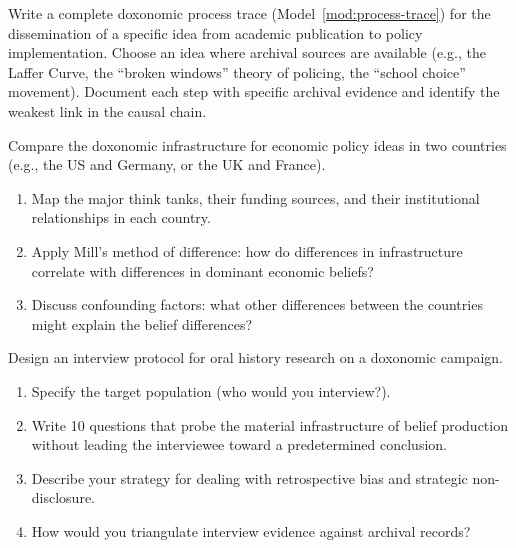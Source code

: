 \begin{exercise}
Write a complete doxonomic process trace (Model~\ref{mod:process-trace}) for the dissemination of a specific idea from academic publication to policy implementation.
Choose an idea where archival sources are available (e.g., the Laffer Curve, the ``broken windows'' theory of policing, the ``school choice'' movement).
Document each step with specific archival evidence and identify the weakest link in the causal chain.
\end{exercise}

\begin{exercise}
Compare the doxonomic infrastructure for economic policy ideas in two countries (e.g., the US and Germany, or the UK and France).
\begin{enumerate}[nosep]
  \item Map the major think tanks, their funding sources, and their institutional relationships in each country.
  \item Apply Mill's method of difference: how do differences in infrastructure correlate with differences in dominant economic beliefs?
  \item Discuss confounding factors: what other differences between the countries might explain the belief differences?
\end{enumerate}
\end{exercise}

\begin{exercise}
Design an interview protocol for oral history research on a doxonomic campaign.
\begin{enumerate}[nosep]
  \item Specify the target population (who would you interview?).
  \item Write 10 questions that probe the material infrastructure of belief production without leading the interviewee toward a predetermined conclusion.
  \item Describe your strategy for dealing with retrospective bias and strategic non-disclosure.
  \item How would you triangulate interview evidence against archival records?
\end{enumerate}
\end{exercise}
